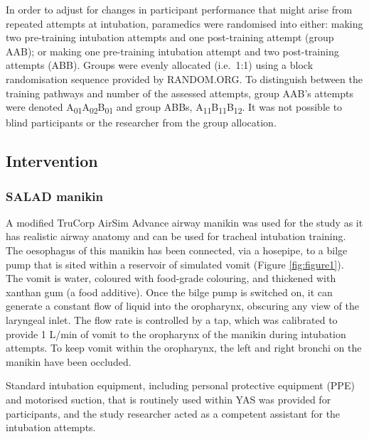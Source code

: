 \documentclass[]{article}
\begin{document}
In order to adjust for changes in participant performance that might
arise from repeated attempts at intubation, paramedics were randomised
into either: making two pre-training intubation attempts and one
post-training attempt (group AAB); or making one pre-training intubation
attempt and two post-training attempts (ABB). Groups were evenly
allocated (i.e.~1:1) using a block randomisation sequence provided by
RANDOM.ORG. To distinguish between the training pathways and number of
the assessed attempts, group AAB's attempts were denoted
A\textsubscript{01}A\textsubscript{02}B\textsubscript{01} and group
ABBs, A\textsubscript{11}B\textsubscript{11}B\textsubscript{12}. It was
not possible to blind participants or the researcher from the group
allocation.

\hypertarget{intervention}{%
\subsection{Intervention}\label{intervention}}

\hypertarget{salad-manikin}{%
\subsubsection{SALAD manikin}\label{salad-manikin}}

A modified TruCorp AirSim Advance airway manikin was used for the study
as it has realistic airway anatomy and can be used for tracheal
intubation training. The oesophagus of this manikin has been connected,
via a hosepipe, to a bilge pump that is sited within a reservoir of
simulated vomit (Figure \ref{fig:figure1}). The vomit is water, coloured
with food-grade colouring, and thickened with xanthan gum (a food
additive). Once the bilge pump is switched on, it can generate a
constant flow of liquid into the oropharynx, obscuring any view of the
laryngeal inlet. The flow rate is controlled by a tap, which was
calibrated to provide 1 L/min of vomit to the oropharynx of the manikin
during intubation attempts. To keep vomit within the oropharynx, the
left and right bronchi on the manikin have been occluded.

Standard intubation equipment, including personal protective equipment
(PPE) and motorised suction, that is routinely used within YAS was
provided for participants, and the study researcher acted as a competent
assistant for the intubation attempts.
\end{document}
